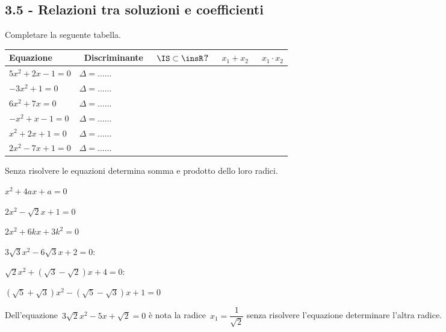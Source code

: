 \subsection*{3.5 - Relazioni tra soluzioni e coefficienti}

\begin{esercizio}
 \label{ese:3.67}
Completare la seguente tabella.

 \begin{tabular*}{.9\textwidth}{@{\extracolsep{\fill}}*{5}{l}}
 \toprule
 Equazione &~Discriminante&~\(\IS\subset\insR\)? &~\(x_1 + x_2\) &~\(x_1 \cdot 
x_2\)\\
\midrule
\(5 x^{2} + 2 x-1 = 0\)&\(\Delta=\ldots \ldots\) & & &\\
\(- 3 x^{2} + 1 = 0\)&\(\Delta=\ldots \ldots\) & & &\\
\(6 x^{2} + 7 x = 0\)&\(\Delta=\ldots \ldots\) & & &\\
\(- x^{2} + x-1 = 0\)&\(\Delta=\ldots \ldots\) & & &\\
\(x^{2} + 2 x + 1 = 0\)&\(\Delta=\ldots \ldots\) & & &\\
\(2 x^{2}-7 x + 1 = 0\)&\(\Delta=\ldots \ldots\) & & &\\
\bottomrule
 \end{tabular*}

\end{esercizio}

\begin{esercizio}
 \label{ese:3.68}
Senza risolvere le equazioni determina somma e prodotto dello loro radici.
\begin{multicols}{2}
\begin{enumeratea}
\item\(x^{2} + 4ax + a = 0\)
\item\(2x^{2}-\sqrt{2} x + 1 = 0\)
\item\(2x^{2} + 6kx + 3k^{2} = 0\)
\item\(3 \sqrt{3} x^{2}-6 \sqrt{3} x + 2 = 0\):
\item\(\sqrt{2} x^{2} + (\sqrt{3}-\sqrt{2}) x + 4 = 0\):
\item\((\sqrt{5} + \sqrt{3}) x^{2}-(\sqrt{5}-\sqrt{3}) x + 1= 0\)
\end{enumeratea}
\end{multicols}
\end{esercizio}

\begin{esercizio}
 \label{ese:3.69}
Dell'equazione~\(3 \sqrt{2} x^{2}-5 x + \sqrt{2} = 0\) 
è nota la radice~\(x_{1} = \dfrac{1}{\sqrt{2}}\) 
senza risolvere l'equazione determinare l'altra radice.
\end{esercizio}

